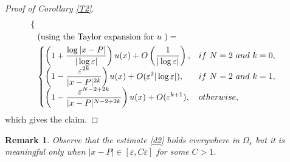 \documentclass[11pt,reqno]{article}
\newtheorem{rem}[teo]{Remark}
\numberwithin{equation}{section}
\newcommand\e\varepsilon
\renewcommand\O\Omega
\begin{document}
\begin{proof}[Proof of Corollary \ref{T2}]
\begin{align*}
\begin{cases}
            \end{cases}\\
            &\left(\hbox{using the Taylor expansion for $u$ }\right)=\\
             & \begin{cases}
              \displaystyle\left  (1+\frac{\log |x-P|}{|\log\e|}\right)u(x)
              +O\left(\frac{1}{|\log\e|}\right), &if \ N=2  \ and\ k=0,\\
				 \displaystyle \left(1-\frac{\e^{2k}}{|x-P|^{2k}}\right)u(x)+O(\e^{2}|\log\e|),& if  \ N=2  \ and\ k=1,\\
                  \displaystyle  \left(1-\frac{\e^{N-2+2k}}{|x-P|^{N-2+2k}}
				\right)u(x)+O(\e^{k+1}), &otherwise,
                \end{cases} \\
			\end{align*}
			which gives the claim.
	\end{proof}
	\begin{rem}
	    Observe that the estimate \eqref{d2} holds everywhere in $\O_\e$ but it is meaningful only when $|x-P|\in [\e,C\e]$ for some $C>1$.
	\end{rem}
\end{document}
